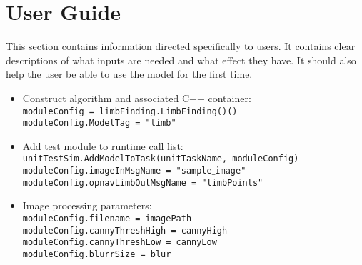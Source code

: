 
\section{User Guide}
This section contains information directed specifically to users. It contains clear descriptions of what inputs are needed and what effect they have. It should also help the user be able to use the model for the first time.

\begin{itemize}
\item Construct algorithm and associated C++ container:\\
\texttt{moduleConfig = limbFinding.LimbFinding()()}\\
\texttt{moduleConfig.ModelTag = "limb"}\\
\item Add test module to runtime call list: \\
\texttt{unitTestSim.AddModelToTask(unitTaskName, moduleConfig)}\\
\texttt{moduleConfig.imageInMsgName = "sample$\_$image"}\\
\texttt{moduleConfig.opnavLimbOutMsgName = "limbPoints"}\\
\item Image processing parameters: \\
\texttt{moduleConfig.filename = imagePath}\\
\texttt{moduleConfig.cannyThreshHigh = cannyHigh}\\
\texttt{moduleConfig.cannyThreshLow = cannyLow}\\
\texttt{moduleConfig.blurrSize = blur}\\
\end{itemize}